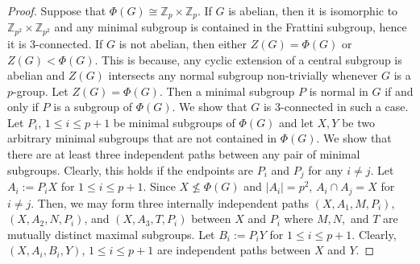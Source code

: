 \documentclass[a4paper,12pt]{article}
\theoremstyle{definition}
\theoremstyle{remark}
\theoremstyle{theorem}
\begin{document}
\begin{proof}
  Suppose that $\Phi(G)\cong\mathbb{Z}_p\times\mathbb{Z}_p$. If $G$ is
  abelian, then it is isomorphic to
  $\mathbb{Z}_{p^2}\times\mathbb{Z}_{p^2}$ and any minimal subgroup is
  contained in the Frattini subgroup, hence it is $3$-connected. If
  $G$ is not abelian, then either $Z(G)=\Phi(G)$ or
  $Z(G)<\Phi(G)$. This is because, any cyclic extension of a
  central subgroup is abelian and $Z(G)$ intersects any
  normal subgroup non-trivially whenever $G$ is a $p$-group. Let
  $Z(G)=\Phi(G)$. Then a minimal subgroup $P$ is normal in
  $G$ if and only if $P$ is a subgroup of $\Phi(G)$. We show that $G$
  is $3$-connected in such a case. Let $P_i$, $1\leq i\leq p+1$ be
  minimal subgroups of $\Phi(G)$ and let $X,Y$ be two arbitrary
  minimal subgroups that are not contained in $\Phi(G)$. We show that
  there are at least three independent paths between any pair of
  minimal subgroups. Clearly, this holds if the endpoints are $P_i$
  and $P_j$ for any $i\neq j$. Let $A_i:=P_iX$ for $1\leq i\leq
  p+1$.
  Since $X\nleq \Phi(G)$ and $|A_i|=p^2$, $A_i\cap A_j=X$ for
  $i\neq j$. Then, we may form three internally independent paths
  $(X,A_1,M,P_i)$, $(X,A_2,N,P_i)$, and $(X,A_3,T,P_i)$ between $X$
  and $P_i$ where $M,N,$ and $T$ are mutually distinct maximal
  subgroups. Let $B_i:=P_iY$ for $1\leq i\leq p+1$. Clearly,
  $(X,A_i,B_i,Y)$, $1\leq i \leq p+1$ are independent paths between
  $X$ and $Y$.



\end{proof}
\end{document}
